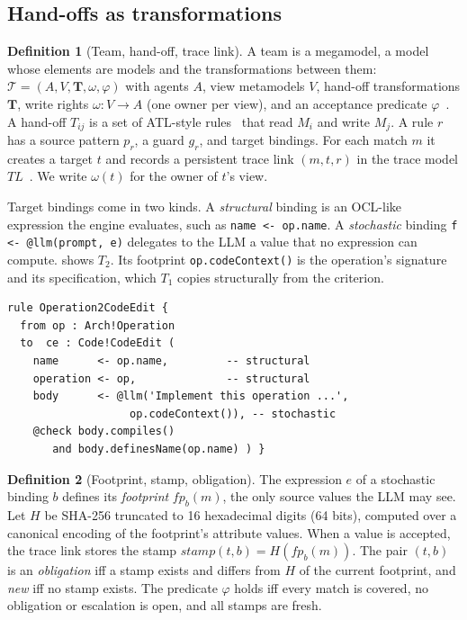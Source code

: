 \documentclass[10pt,conference]{IEEEtran}
\theoremstyle{definition}
\newtheorem{definition}{Definition}
\newcommand{\TL}{\mathit{TL}}
\newcommand{\team}{\mathcal{T}}
\newcommand{\code}[1]{\texttt{#1}}
\newcommand{\fp}{\mathit{fp}}
\begin{document}
\subsection{Hand-offs as transformations}\label{sec:handoffs}

\begin{definition}[Team, hand-off, trace link]\label{def:team}
A team is a megamodel, a model whose elements are models and the transformations between them:
$\team=(A,V,\mathbf{T},\omega,\varphi)$ with agents $A$, view metamodels $V$, hand-off transformations
$\mathbf{T}$, write rights $\omega: V\to A$ (one owner per view), and an acceptance predicate
$\varphi$~\cite{anon2027agentm2m}. A hand-off $T_{ij}$ is a set of ATL-style rules~\cite{jouault2008atl} that
read $M_i$ and write $M_j$. A rule $r$ has a source pattern $p_r$, a guard $g_r$, and target bindings. For each
match $m$ it creates a target $t$ and records a persistent trace link $(m,t,r)$ in the trace model
$\TL$~\cite{jouault2005traceability,vara2014metagem}. We write $\omega(t)$ for the owner of $t$'s view.
\end{definition}

Target bindings come in two kinds. A \emph{structural} binding is an OCL-like expression the engine evaluates,
such as \code{name <- op.name}. A \emph{stochastic} binding \code{f <- @llm(prompt, e)} delegates to the LLM
a value that no expression can compute.  shows $T_2$. Its footprint \code{op.codeContext()} is
the operation's signature and its specification, which $T_1$ copies structurally from the criterion.

\begin{lstlisting}[language=ATL, float=t, caption={Hand-off $T_2$ (Architect $\to$ Developer) of the
running example, abridged.}, label={lst:a2c}]
rule Operation2CodeEdit {
  from op : Arch!Operation
  to  ce : Code!CodeEdit (
    name      <- op.name,         -- structural
    operation <- op,              -- structural
    body      <- @llm('Implement this operation ...',
                   op.codeContext()), -- stochastic
    @check body.compiles()
       and body.definesName(op.name) ) }
\end{lstlisting}

\begin{definition}[Footprint, stamp, obligation]\label{def:stamp}
The expression $e$ of a stochastic binding $b$ defines its \emph{footprint} $\fp_b(m)$, the only source
values the LLM may see. Let $H$ be SHA-256 truncated to 16 hexadecimal digits (64 bits), computed over a
canonical encoding of the footprint's attribute values. When a value is accepted, the trace link stores the
stamp $\mathit{stamp}(t,b)=H(\fp_b(m))$. The pair $(t,b)$ is an \emph{obligation} iff a stamp exists and
differs from $H$ of the current footprint, and \emph{new} iff no stamp exists. The predicate $\varphi$ holds
iff every match is covered, no obligation or escalation is open, and all stamps are fresh.
\end{definition}
\end{document}
